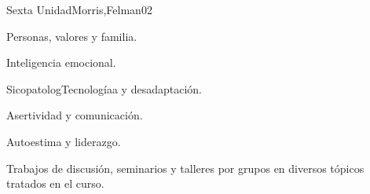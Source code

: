 \begin{syllabus}
\begin{unit}{Sexta Unidad}{Morris,Felman}{0}{2}
\begin{topics}
	\item Personas, valores y familia.
	\item Inteligencia emocional.
	\item SicopatologTecnologíaa y desadaptación.
	\item Asertividad y comunicación.
	\item Autoestima y liderazgo.
\end{topics}
\begin{unitgoals}
	\item Trabajos de discusión, seminarios y talleres por grupos en diversos tópicos tratados en el curso.
\end{unitgoals}
\end{unit}



\begin{coursebibliography}
\end{coursebibliography}

\end{syllabus}
